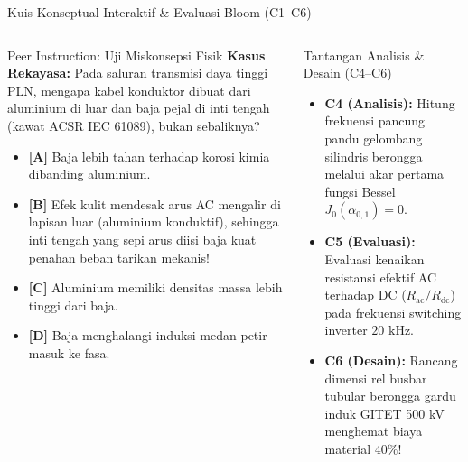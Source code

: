 \documentclass[aspectratio=169,10pt]{beamer}
\begin{document}
\begin{frame}{Kuis Konseptual Interaktif \& Evaluasi Bloom (C1--C6)}
  \begin{columns}[t]
    \begin{alertblock}{Peer Instruction: Uji Miskonsepsi Fisik}
      \footnotesize
      \textbf{Kasus Rekayasa:} Pada saluran transmisi daya tinggi PLN, mengapa kabel konduktor dibuat dari aluminium di luar dan baja pejal di inti tengah (kawat ACSR IEC 61089), bukan sebaliknya?
      \vspace{0.05cm}
      \begin{itemize}\setlength{\itemsep}{1pt}
        \item \textbf{[A]} Baja lebih tahan terhadap korosi kimia dibanding aluminium.
        \item \textbf{[B]} Efek kulit mendesak arus AC mengalir di lapisan luar (aluminium konduktif), sehingga inti tengah yang sepi arus diisi baja kuat penahan beban tarikan mekanis!
        \item \textbf{[C]} Aluminium memiliki densitas massa lebih tinggi dari baja.
        \item \textbf{[D]} Baja menghalangi induksi medan petir masuk ke fasa.
      \end{itemize}
    \end{alertblock}

    \begin{block}{Tantangan Analisis \& Desain (C4--C6)}
      \footnotesize
      \begin{itemize}\setlength{\itemsep}{2pt}
        \item \textbf{C4 (Analisis):} Hitung frekuensi pancung pandu gelombang silindris berongga melalui akar pertama fungsi Bessel $J_0(\alpha_{0,1}) = 0$.
        \item \textbf{C5 (Evaluasi):} Evaluasi kenaikan resistansi efektif AC terhadap DC ($R_{\text{ac}}/R_{\text{dc}}$) pada frekuensi switching inverter $20\text{ kHz}$.
        \item \textbf{C6 (Desain):} Rancang dimensi rel busbar tubular berongga gardu induk GITET 500 kV menghemat biaya material $40\%$!
      \end{itemize}
    \end{block}
  \end{columns}
\end{frame}
\end{document}
